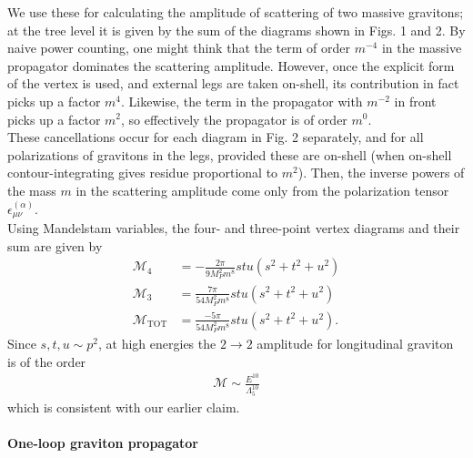\documentclass{book}
\theoremstyle{definition}
\newcommand{\nn}{\nonumber}
\newcommand{\al}{\alpha}
\newcommand{\f}[2]{\frac{#1}{#2}}
\begin{document}
\begin{framed}
	
	
	
	
	
	
	
	We use these for calculating the amplitude of scattering of two massive gravitons; at the tree level it is given by the sum of the diagrams shown in Figs. 1 and 2. By naive power counting, one might think that the term of order $m^{-4}$ in the massive propagator dominates the scattering amplitude. However, once the explicit form of the vertex is used, and external legs are taken on-shell, its contribution in fact picks up a factor $m^4$.  Likewise, the term
	in the propagator with $m^{-2}$ in front picks up a factor $m^2$, so effectively the
	propagator is of order $m^0$. \\
	
	
	
	
	
	These cancellations occur for each diagram in 
	Fig. 2 separately, and for all polarizations of gravitons in the legs, provided
	these are on-shell (when on-shell contour-integrating gives residue proportional to $m^2$). Then, the inverse powers of the mass $m$ in the scattering
	amplitude come only from the polarization tensor $\epsilon_{\mu\nu}^{(\al)}$. \\
	
	
	Using Mandelstam variables, the four- and three-point vertex diagrams and their sum are given by
	\begin{align}
	\mathcal{M}_4 &=  -\f{2\pi}{9M_P^2 m^8} stu(s^2 + t^2 + u^2)\nn\\
	\mathcal{M}_3 &= \f{7\pi }{54 M_P^2 m^8}stu(s^2 + t^2 + u^2)\nn\\
	\mathcal{M}_\text{TOT} &= \f{-5\pi}{54M_P^2 m^8}stu(s^2+t^2+u^2).
	\end{align}
	Since $s,t,u \sim p^2$, at high energies the $2\to 2$ amplitude for longitudinal graviton is of the order
	\begin{align}
	\mathcal{M} \sim \f{E^{10}}{\Lambda_5^{10}}
	\end{align}
	which is consistent with our earlier claim. \\
	
	
	\paragraph{One-loop graviton propagator}
	

\end{framed}
\end{document}
